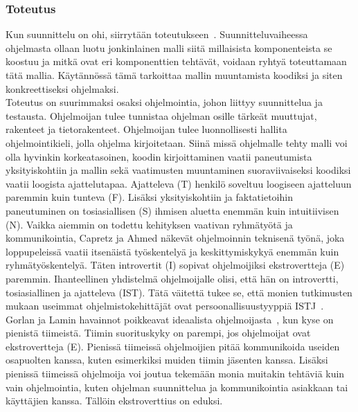 \documentclass[finnish]{../tktltiki2}
\theoremstyle{definition}
\theoremstyle{remark}
\begin{document}
\subsubsection{Toteutus}

Kun suunnittelu on ohi, siirrytään toteutukseen~\cite{SWEBOK:409902}. Suunnitteluvaiheessa ohjelmasta ollaan luotu jonkinlainen malli siitä millaisista komponenteista se koostuu
ja mitkä ovat eri komponenttien tehtävät, voidaan ryhtyä toteuttamaan tätä mallia. Käytännössä tämä tarkoittaa
mallin muuntamista koodiksi ja siten konkreettiseksi ohjelmaksi.\\

Toteutus on suurimmaksi osaksi ohjelmointia, johon liittyy suunnittelua ja testausta. Ohjelmoijan tulee tunnistaa ohjelman
osille tärkeät muuttujat, rakenteet ja tietorakenteet. Ohjelmoijan
tulee luonnollisesti hallita ohjelmointikieli, jolla ohjelma kirjoitetaan. Siinä missä ohjelmalle tehty malli voi olla hyvinkin korkeatasoinen, koodin kirjoittaminen vaatii paneutumista yksityiskohtiin ja mallin sekä vaatimusten muuntaminen suoraviivaiseksi koodiksi vaatii loogista ajattelutapaa. Ajatteleva (T)
henkilö soveltuu loogiseen ajatteluun paremmin kuin tunteva (F). Lisäksi yksityiskohtiin ja faktatietoihin paneutuminen on tosiasiallisen (S) ihmisen aluetta enemmän kuin intuitiivisen (N). Vaikka aiemmin on todettu kehityksen vaativan ryhmätyötä ja kommunikointia, Capretz ja Ahmed näkevät ohjelmoinnin teknisenä työnä, joka loppupeleissä vaatii itsenäistä työskentelyä ja keskittymiskykyä enemmän kuin ryhmätyöskentelyä. Täten introvertit (I) sopivat ohjelmoijiksi ekstrovertteja (E) paremmin. Ihanteellinen yhdistelmä ohjelmoijalle olisi, että hän on introvertti, tosiasiallinen ja ajatteleva (IST). Tätä väitettä tukee se, että monien tutkimusten mukaan useimmat ohjelmistokehittäjät ovat persoonallisuustyyppiä ISTJ~\cite{Capretz:2003:PTS:766407.766410,Capretz:2010:MSS:1726559.1726574}.\\

Gorlan ja Lamin havainnot poikkeavat ideaalista ohjelmoijasta~\cite{Gorla:2004:WWB:990680.990684}, kun kyse on pienistä tiimeistä. Tiimin suorituskyky on parempi, jos ohjelmoijat ovat ekstrovertteja (E). Pienissä tiimeissä ohjelmoijien pitää kommunikoida useiden osapuolten kanssa, kuten esimerkiksi muiden tiimin jäsenten kanssa. Lisäksi pienissä tiimeissä ohjelmoija voi joutua tekemään monia muitakin tehtäviä kuin vain ohjelmointia, kuten ohjelman suunnittelua ja kommunikointia asiakkaan tai käyttäjien kanssa. Tällöin ekstroverttius on eduksi.
\end{document}

